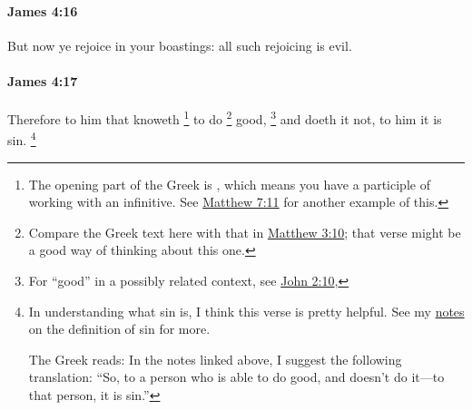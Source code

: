 		\paragraph{James 4:16} %
			\label{JAMES-4-16}

			But now ye rejoice in your boastings: all such rejoicing is evil.

			\begin{framed}
			\scriptsize
				\begin{compactdesc}
					\item[SBLG] 
				\end{compactdesc}
			\end{framed}
		
		\paragraph{James 4:17} %
			\label{JAMES-4-17}
			
			Therefore to him that knoweth%
				\footnote{%
					The opening part of the Greek is , which means you have a participle of  working with an infinitive. See \hyperref[MATTHEW-7-11]{Matthew 7:11} for another example of this.
					}
			to do%
				\footnote{%
					Compare the Greek text here with that in \hyperref[MATTHEW-3-10]{Matthew 3:10}; that verse might be a good way of thinking about this one.
					}
			good,%
				\footnote{%
					For ``good'' in a possibly related context, see \hyperref[JOHN-2-10]{John 2:10}, 
					}
			and doeth it not, to him it is sin.%
				\footnote{%
					In understanding what sin is, I think this verse is pretty helpful. See my \hyperref[SIN-definition]{notes} on the definition of sin for more.
					
					The Greek reads:  In the notes linked above, I suggest the following translation: ``So, to a person who is able to do good, and doesn't do it---to that person, it is sin.''
					}
					
